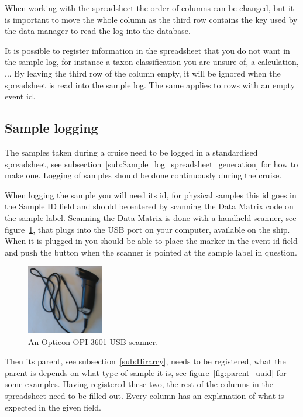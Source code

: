 \documentclass[a4paper,english, 11pt]{article}
\begin{document}
When working with the spreadsheet the order of columns can be changed, but it is important to move the whole column as the third row contains the key used by the data manager to read the log into the database. 

It is possible to register information in the spreadsheet that you do not want in the sample log, for instance a taxon classification you are unsure of, a calculation, ... By leaving the third row of the column empty, it will be ignored when the spreadsheet is read into the sample log. The same applies to rows with an empty event id.



\subsection{Sample logging} %
\label{sub:spreadsheet_reg}


The samples taken during a cruise need to be logged in a standardised spreadsheet, see subsection~\ref{sub:Sample_log_spreadsheet_generation} for how to make one. Logging of samples should be done continuously during the cruise. 

When logging the sample you will need its id, for physical samples this id goes in the Sample ID field and should be entered by scanning the Data Matrix code on the sample label. Scanning the Data Matrix is done with a handheld scanner, see figure~\ref{fig:scanner}, that plugs into the USB port on your computer, available on the ship. When it is plugged in you should be able to place the marker in the event id field and push the button when the scanner is pointed at the sample label in question. 


\begin{figure}[h!tb]
    \centering
    \includegraphics[width=0.3\textwidth]{Scanner.jpg}
    \caption{\label{fig:scanner}
        An Opticon OPI-3601 USB scanner.
    }
\end{figure}


Then its parent, see subsection~\ref{sub:Hirarcy}, needs to be registered, what the parent is depends on what type of sample it is, see figure~\ref{fig:parent_uuid} for some examples. Having registered these two, the rest of the columns in the spreadsheet need to be filled out. Every column has an explanation of what is expected in the given field. 
\end{document}
